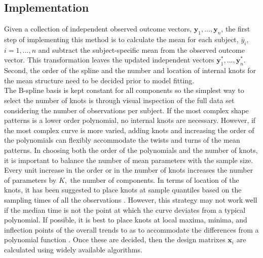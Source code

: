 \documentclass[12pt]{article}
\newcommand{\B}[0]{\mathbf}
\begin{document}
\subsection{Implementation}
Given a collection of independent observed outcome vectors, $\B y_{1},...,\B y_{n}$, the first step of implementing this method is to calculate the mean for each subject, $\bar{y}_{i}$, $i=1,...,n$ and subtract the subject-specific mean from the observed outcome vector. This transformation leaves the updated independent vectors $\B y^{*}_{1},...,\B y^{*}_{n}$. Second, the order of the spline and the number and location of internal knots for the mean structure need to be decided prior to model fitting. \\

The B-spline basis is kept constant for all components so the simplest way to select the number of knots is through visual inspection of the full data set considering the number of observations per subject. If the most complex shape patterns is a lower order polynomial, no internal knots are necessary. However, if the most complex curve is more varied, adding knots and increasing the order of the polynomials can flexibly accommodate the twists and turns of the mean patterns. In choosing both the order of the polynomials and the number of knots, it is important to balance the number of mean parameters with the sample size. Every unit increase in the order or in the number of knots increases the number of parameters by $K,$ the number of components. In terms of location of the knots, it has been suggested to place knots at sample quantiles based on the sampling times of all the observations \cite{ruppert2002}. However, this strategy may not work well if the median time is not the point at which the curve deviates from a typical polynomial. If possible, it is best to place knots at local maxima, minima, and inflection points of the overall trends to as to accommodate the differences from a polynomial function \cite{eubank1999}.  Once these are decided, then the design matrixes $\B x_{i}$ are calculated using widely available algorithms. \\
\end{document}
